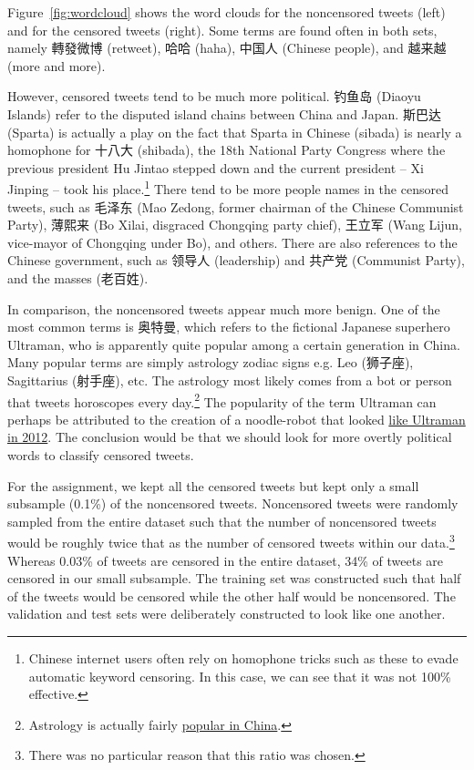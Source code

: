 \documentclass{sig-alternate-05-2015}
\begin{document}
Figure~\ref{fig:wordcloud} shows the word clouds for the noncensored tweets (left) and for the censored tweets (right). Some terms are found often in both sets, namely 轉發微博 (retweet), 哈哈 (haha), 中国人 (Chinese people), and 越来越 (more and more).

However, censored tweets tend to be much more political. 钓鱼岛 (Diaoyu Islands) refer to the disputed island chains between China and Japan. 斯巴达 (Sparta) is actually a play on the fact that Sparta in Chinese (sibada) is nearly a homophone for 十八大 (shibada), the 18th National Party Congress where the previous president Hu Jintao stepped down and the current president -- Xi Jinping -- took his place.\footnote{Chinese internet users often rely on homophone tricks such as these to evade automatic keyword censoring. In this case, we can see that it was not 100\% effective.} There tend to be more people names in the censored tweets, such as 毛泽东 (Mao Zedong, former chairman of the Chinese Communist Party), 薄熙来 (Bo Xilai, disgraced Chongqing party chief), 王立军 (Wang Lijun, vice-mayor of Chongqing under Bo), and others. There are also references to the Chinese government, such as 领导人 (leadership) and 共产党 (Communist Party), and the masses (老百姓).

In comparison, the noncensored tweets appear much more benign. One of the most common terms is 奥特曼, which refers to the fictional Japanese superhero Ultraman, who is apparently quite popular among a certain generation in China. Many popular terms are simply astrology zodiac signs e.g. Leo (狮子座), Sagittarius (射手座), etc. The astrology most likely comes from a bot or person that tweets horoscopes every day.\footnote{Astrology is actually fairly \href{https://newrepublic.com/article/119500/chinese-astrology-surprising-prominence-horoscopes}{popular in China}.} The popularity of the term Ultraman can perhaps be attributed to the creation of a noodle-robot that looked \href{http://asiasociety.org/blog/asia/video-when-going-gets-tough-superhero-robot-turns-noodle-making}{like Ultraman in 2012}. The conclusion would be that we should look for more overtly political words to classify censored tweets.

For the assignment, we kept all the censored tweets but kept only a small subsample (0.1\%) of the noncensored tweets. Noncensored tweets were randomly sampled from the entire dataset such that the number of noncensored tweets would be roughly twice that as the number of censored tweets within our data.\footnote{There was no particular reason that this ratio was chosen.} Whereas 0.03\% of tweets are censored in the entire dataset, 34\% of tweets are censored in our small subsample. The training set was constructed such that half of the tweets would be censored while the other half would be noncensored. The validation and test sets were deliberately constructed to look like one another. 
\end{document}
